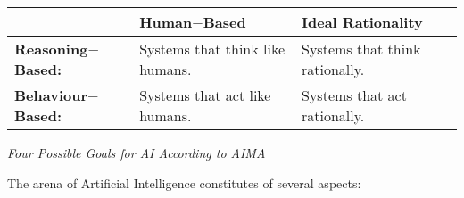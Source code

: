 \documentclass[12pt]{article}
\begin{document}
\begin{table}[H]
\begin{adjustbox}{max width=\textwidth}
\begin{tabular}{p{3.91cm}p{6.21cm}p{5.77cm}}
\hline
\multicolumn{1}{|p{3.91cm}}{} & 
\multicolumn{1}{|p{6.21cm}}{\textbf{\textcolor[HTML]{1A1A1A}{Human$-$Based}}} & 
\multicolumn{1}{|p{5.77cm}|}{\textbf{\textcolor[HTML]{1A1A1A}{Ideal Rationality}}} \\ 
\hline
\multicolumn{1}{|p{3.91cm}}{\textbf{\textcolor[HTML]{1A1A1A}{Reasoning$-$Based:}}} & 
\multicolumn{1}{|p{6.21cm}}{\textcolor[HTML]{1A1A1A}{Systems that think like humans.}} & 
\multicolumn{1}{|p{5.77cm}|}{\textcolor[HTML]{1A1A1A}{Systems that think rationally.}} \\ 
\hline
\multicolumn{1}{|p{3.91cm}}{\textbf{\textcolor[HTML]{1A1A1A}{Behaviour$-$Based:}}} & 
\multicolumn{1}{|p{6.21cm}}{\textcolor[HTML]{1A1A1A}{Systems that act like humans.}} & 
\multicolumn{1}{|p{5.77cm}|}{\textcolor[HTML]{1A1A1A}{Systems that act rationally.}} \\ 
\hline
\end{tabular}
\end{adjustbox}
\end{table}
\vspace{2\baselineskip}
\begin{center}
{\footnotesize \textit{\textcolor[HTML]{1A1A1A}{Four Possible Goals for AI According to}\textcolor[HTML]{1A1A1A}{ AIMA}}}
\end{center}


The arena of Artificial Intelligence constitutes of several aspects:
\end{document}
